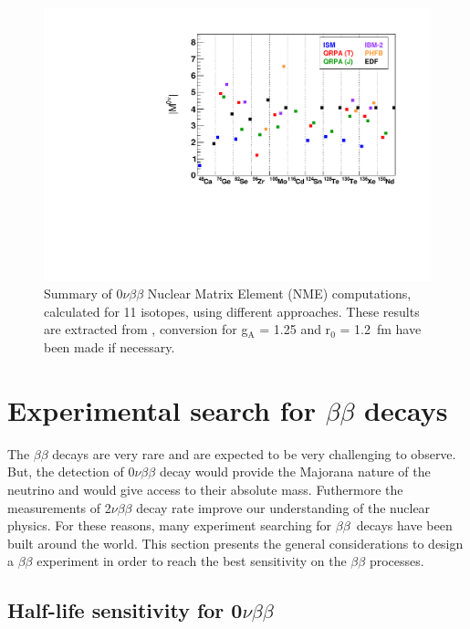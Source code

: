 \documentclass[main.tex]{subfiles}
\begin{document}
\begin{figure}[h!]
\begin{center}
\includegraphics[scale=0.70]{pictures/Chap2/NMEvalue.pdf}
\caption{Summary of 0$\nu\beta\beta$ Nuclear Matrix Element (NME) computations, calculated for 11 isotopes, using different approaches. These results are extracted from \cite{TheoryOfNeutrinolessDBD}, conversion for g$_{\text{A}}$ = 1.25 and r$_{\text{0}}$  = 1.2~fm have been made if necessary.}
\label{NME}
\end{center}
\end{figure}


\FloatBarrier

\section{Experimental search for $\beta\beta$ decays}


\NI The $\beta\beta$ decays are very rare and are expected to be very challenging to observe. But, the detection of 0$\nu\beta\beta$ decay would provide the Majorana nature of the neutrino and would give access to their absolute mass. Futhermore the measurements of 2$\nu\beta\beta$ decay rate improve our understanding of the nuclear physics. For these reasons, many experiment searching for $\beta\beta$~decays have been built around the world. This section presents the general considerations to design a $\beta\beta$ experiment in order to reach the best sensitivity on the $\beta\beta$ processes.



\subsection{Half-life sensitivity for 0$\nu\beta\beta$}
\end{document}
